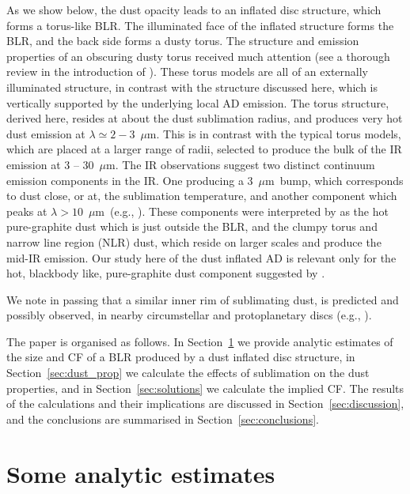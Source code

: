 \documentclass[a4paper,fleqn,usenatbib]{mnras}
\newcommand{\mic}{\mbox{$\mu$m}}
\begin{document}
As we show below, the dust opacity leads to an inflated disc structure, which forms a torus-like BLR. The illuminated face of the inflated structure
forms the BLR, and the back side forms a dusty torus. The structure and emission properties of an obscuring dusty 
torus received much attention (see a thorough review in the introduction of \citealt{Chan16}).
These torus models are all of an externally illuminated structure, in contrast with the structure discussed here, which
is vertically supported by the underlying local AD emission. The torus structure, derived here, resides at about the
dust sublimation radius, and produces very hot dust emission at $\lambda\simeq 2-3$~\mic. This is in contrast with the typical 
torus models, which are placed at a larger range of radii, selected to produce the bulk of the IR emission at
3 -- 30~\mic. The IR observations suggest two distinct continuum emission components in the IR. One
producing a 3~\mic\ bump, which corresponds to dust close, or at, the sublimation temperature, and another component 
which peaks at $\lambda >10$~\mic\ (e.g., \citealt{Wills87, Mor11, Hernan16, Symeonidis16}). These
components were interpreted by \citet{Mor12}
as the hot pure-graphite dust which is just outside the BLR, and the clumpy torus
and narrow line region (NLR) dust, which reside on larger scales and produce the mid-IR emission. 
Our study here of the dust inflated AD is relevant only for the hot, blackbody like, pure-graphite 
dust component suggested by \citet{Mor12}.

We note in passing that a similar inner rim of sublimating dust, is predicted and 
possibly observed, in nearby circumstellar and protoplanetary discs (e.g., \citealt*{Dullemond01, Natta01, Isella05}).

The paper is organised as follows. In Section~\ref{sec:analytic_estimates} we provide analytic estimates of the size and CF of a BLR produced by a dust inflated disc structure, in Section~\ref{sec:dust_prop} we calculate the effects of sublimation on the dust properties, and in Section~\ref{sec:solutions} we calculate
the implied CF. The results of the calculations and their implications are discussed in Section~\ref{sec:discussion}, and the conclusions are summarised in Section~\ref{sec:conclusions}. 


  
	
\section{Some analytic estimates} \label{sec:analytic_estimates}
\end{document}
